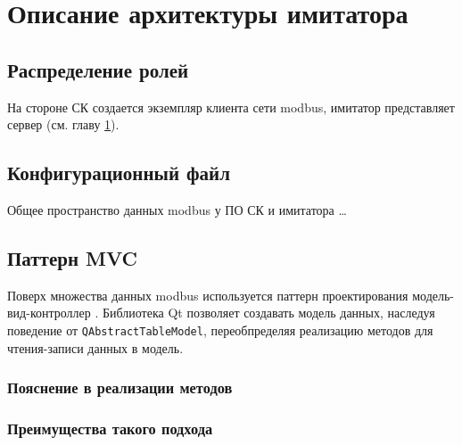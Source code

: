 \chapter{Описание архитектуры имитатора}\label{ch:ch2}

\section{Распределение ролей}

На стороне СК создается экземпляр клиента сети modbus,
имитатор представляет сервер (см. главу \ref{ch:ch2}).





\section{Конфигурационный файл}\label{sec:ch2/sec1}

Общее пространство данных modbus у ПО СК и имитатора \ldots






\section{Паттерн MVC}

Поверх множества данных modbus используется паттерн проектирования модель-вид-контроллер \cite{book:pattern:band_of_4}.
Библиотека Qt позволяет создавать модель данных, наследуя поведение от \lstinline[language=C]!QAbstractTableModel!,
переобпределяя реализацию методов для чтения-записи данных в модель.

\subsection{Пояснение в реализации методов}

\subsection{Преимущества такого подхода}




